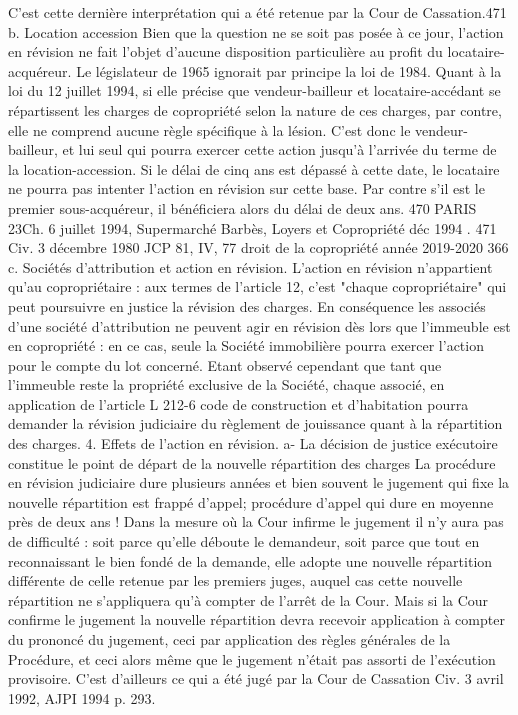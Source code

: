 C’est cette dernière interprétation qui a été retenue par la Cour de Cassation.471
b. Location accession
Bien que la question ne se soit pas posée à ce jour, l’action en révision ne fait l’objet d’aucune disposition particulière au profit du locataire-acquéreur.
Le législateur de 1965 ignorait par principe la loi de 1984. Quant à la loi du 12 juillet 1994, si elle précise que vendeur-bailleur et locataire-accédant se répartissent les charges de copropriété selon la nature de ces charges, par contre, elle ne comprend aucune règle spécifique à la lésion.
C’est donc le vendeur-bailleur, et lui seul qui pourra exercer cette action jusqu’à l’arrivée du terme de la location-accession. Si le délai de cinq ans est dépassé à cette date, le locataire ne pourra pas intenter l’action en révision sur cette base. Par contre s’il est le premier sous-acquéreur, il bénéficiera alors du délai de deux ans.
470 PARIS 23\degres Ch. 6 juillet 1994, Supermarché Barbès, Loyers et Copropriété déc 1994 .
471 Civ. 3 décembre 1980 JCP 81, IV, 77
droit de la copropriété année 2019-2020
366
c. Sociétés d'attribution et action en révision.
L'action en révision n'appartient qu'au copropriétaire : aux termes de l'article 12, c'est "chaque copropriétaire" qui peut poursuivre en justice la révision des charges.
En conséquence les associés d'une société d'attribution ne peuvent agir en révision dès lors que l'immeuble est en copropriété : en ce cas, seule la Société immobilière pourra exercer l'action pour le compte du lot concerné.
Etant observé cependant que tant que l'immeuble reste la propriété exclusive de la Société, chaque associé, en application de l'article L 212-6 code de construction et d'habitation pourra demander la révision judiciaire du règlement de jouissance quant à la répartition des charges.
4. Effets de l'action en révision.
a- La décision de justice exécutoire constitue le point de départ de la nouvelle répartition des charges
La procédure en révision judiciaire dure plusieurs années et bien souvent le jugement qui fixe la nouvelle répartition est frappé d'appel; procédure d'appel qui dure en moyenne près de deux ans !
Dans la mesure où la Cour infirme le jugement il n'y aura pas de difficulté : soit parce qu'elle déboute le demandeur, soit parce que tout en reconnaissant le bien fondé de la demande, elle adopte une nouvelle répartition différente de celle retenue par les premiers juges, auquel cas cette nouvelle répartition ne s'appliquera qu'à compter de l'arrêt de la Cour.
Mais si la Cour confirme le jugement la nouvelle répartition devra recevoir application à compter du prononcé du jugement, ceci par application des règles générales de la Procédure, et ceci alors même que le jugement n'était pas assorti de l’exécution provisoire. C'est d'ailleurs ce qui a été jugé par la Cour de Cassation Civ. 3 avril 1992, AJPI 1994 p. 293.
